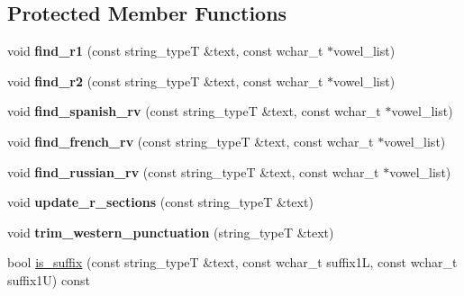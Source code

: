 \subsection*{Protected Member Functions}
\begin{DoxyCompactItemize}
\item 
\hypertarget{classstemming_1_1stem_a364b7a76f683d5244715638069a4fa93}{void {\bfseries find\+\_\+r1} (const string\+\_\+type\+T \&text, const wchar\+\_\+t $\ast$vowel\+\_\+list)}\label{classstemming_1_1stem_a364b7a76f683d5244715638069a4fa93}

\item 
\hypertarget{classstemming_1_1stem_ab381c0d6a6291c2c21515e9398e83085}{void {\bfseries find\+\_\+r2} (const string\+\_\+type\+T \&text, const wchar\+\_\+t $\ast$vowel\+\_\+list)}\label{classstemming_1_1stem_ab381c0d6a6291c2c21515e9398e83085}

\item 
\hypertarget{classstemming_1_1stem_ae6cb258098ba91462d421977b1eed8e7}{void {\bfseries find\+\_\+spanish\+\_\+rv} (const string\+\_\+type\+T \&text, const wchar\+\_\+t $\ast$vowel\+\_\+list)}\label{classstemming_1_1stem_ae6cb258098ba91462d421977b1eed8e7}

\item 
\hypertarget{classstemming_1_1stem_a9626e49b982eda0d8ec3bb861d864b42}{void {\bfseries find\+\_\+french\+\_\+rv} (const string\+\_\+type\+T \&text, const wchar\+\_\+t $\ast$vowel\+\_\+list)}\label{classstemming_1_1stem_a9626e49b982eda0d8ec3bb861d864b42}

\item 
\hypertarget{classstemming_1_1stem_a53dcfe6b18fe5b5882474f222190ef1b}{void {\bfseries find\+\_\+russian\+\_\+rv} (const string\+\_\+type\+T \&text, const wchar\+\_\+t $\ast$vowel\+\_\+list)}\label{classstemming_1_1stem_a53dcfe6b18fe5b5882474f222190ef1b}

\item 
\hypertarget{classstemming_1_1stem_a9dcc3d89844ecd5c81eabf80936a0209}{void {\bfseries update\+\_\+r\+\_\+sections} (const string\+\_\+type\+T \&text)}\label{classstemming_1_1stem_a9dcc3d89844ecd5c81eabf80936a0209}

\item 
\hypertarget{classstemming_1_1stem_a34b5a8d8368dba5501b128d0710ea5c1}{void {\bfseries trim\+\_\+western\+\_\+punctuation} (string\+\_\+type\+T \&text)}\label{classstemming_1_1stem_a34b5a8d8368dba5501b128d0710ea5c1}

\item 
\hypertarget{classstemming_1_1stem_ac318ddd46a716673edf3678c47d3035c}{bool \hyperlink{classstemming_1_1stem_ac318ddd46a716673edf3678c47d3035c}{is\+\_\+suffix} (const string\+\_\+type\+T \&text, const wchar\+\_\+t suffix1\+L, const wchar\+\_\+t suffix1\+U) const }\label{classstemming_1_1stem_ac318ddd46a716673edf3678c47d3035c}


\end{DoxyCompactItemize}

